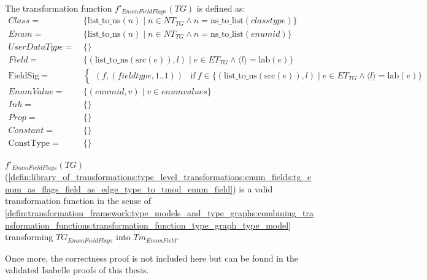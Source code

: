 \begin{defin}
\label{defin:library_of_transformations:type_level_transformations:enum_fields:tg_enum_as_flags_field_as_edge_type_to_tmod_enum_field}
The transformation function $f'_{EnumFieldFlags}(TG)$ is defined as:
\begin{align*}
Class =\ &\{\mathrm{list\_\!to\_\!ns}(n) \mid n \in NT_{TG} \land n = \mathrm{ns\_\!to\_\!list}(classtype) \} \\
Enum =\ &\{\mathrm{list\_\!to\_\!ns}(n) \mid n \in NT_{TG} \land n = \mathrm{ns\_\!to\_\!list}(enumid) \} \\
UserDataType =\ &\{\} \\
Field =\ &\{(\mathrm{list\_\!to\_\!ns}(\mathrm{src}(e)), l) \mid e \in ET_{TG} \land \langle l \rangle = \mathrm{lab}(e) \} \\
\mathrm{FieldSig} =\ &\begin{cases}
    (f, (fieldtype, 1..1)) &\mathrm{if}\ f \in \{(\mathrm{list\_\!to\_\!ns}(\mathrm{src}(e)), l) \mid e \in ET_{TG} \land \langle l \rangle = \mathrm{lab}(e) \}
\end{cases} \\
EnumValue =\ &\{(enumid, v) \mid v \in enumvalues\} \\
Inh =\ &\{\} \\
Prop =\ &\{\} \\
Constant =\ &\{\} \\
\mathrm{ConstType} =\ &\{\}
\end{align*}
\end{defin}

\begin{thm}
\label{defin:library_of_transformations:type_level_transformations:enum_fields:tg_enum_as_flags_field_as_edge_type_to_tmod_enum_field_func}
$f'_{EnumFieldFlags}(TG)$ (\cref{defin:library_of_transformations:type_level_transformations:enum_fields:tg_enum_as_flags_field_as_edge_type_to_tmod_enum_field}) is a valid transformation function in the sense of \cref{defin:transformation_framework:type_models_and_type_graphs:combining_transformation_functions:transformation_function_type_graph_type_model} transforming $TG_{EnumFieldFlags}$ into $Tm_{EnumField}$.
\end{thm}

Once more, the correctness proof is not included here but can be found in the validated Isabelle proofs of this thesis.